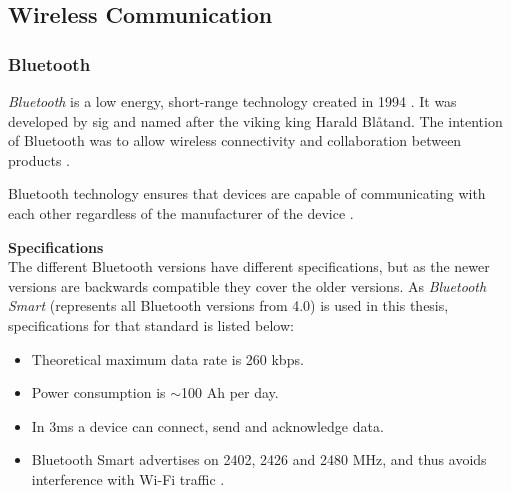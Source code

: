\subsection{Wireless Communication}
\subsubsection{Bluetooth}
\textit{Bluetooth} is a low energy, short-range technology created in 1994 \cite{ble2016}. It was developed by \acrshort{sig} and named after the viking king Harald Blåtand. The intention of Bluetooth was to allow wireless connectivity and collaboration between products \cite{bluetoothsig2016}.

Bluetooth technology ensures that devices are capable of communicating with each other regardless of the manufacturer of the device \cite{prabhu2004}.  

\textbf{Specifications}
\\
The different Bluetooth versions have different specifications, but as the newer versions are backwards compatible \cite{bluetoothreport2013} they cover the older versions. As \textit{Bluetooth Smart} (represents all Bluetooth versions from 4.0) is used in this thesis, specifications for that standard is listed below:

\begin{itemize}
	\item Theoretical maximum data rate is 260 kbps.
	\item Power consumption is $\sim$100 \micro Ah per day.
	\item In 3ms a device can connect, send and acknowledge data.
	\item Bluetooth Smart advertises on 2402, 2426 and 2480 MHz, and thus avoids interference with Wi-Fi traffic \cite{csr2010}.
\end{itemize}